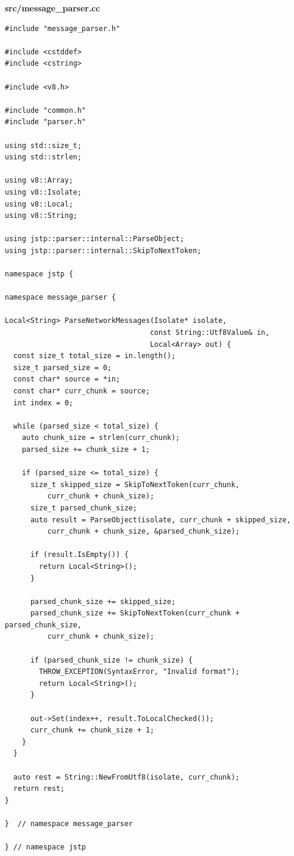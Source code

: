 \documentclass[%
  ukrainian, utf8, columnvii, simple,
  hpadding=10mm, vpadding=10mm, reduceheight=2mm,
  floatsection,
]{eskdtext}
\begin{document}
\textbf{src/message\_parser.cc}

\begin{verbatim}
#include "message_parser.h"

#include <cstddef>
#include <cstring>

#include <v8.h>

#include "common.h"
#include "parser.h"

using std::size_t;
using std::strlen;

using v8::Array;
using v8::Isolate;
using v8::Local;
using v8::String;

using jstp::parser::internal::ParseObject;
using jstp::parser::internal::SkipToNextToken;

namespace jstp {

namespace message_parser {

Local<String> ParseNetworkMessages(Isolate* isolate,
                                  const String::Utf8Value& in,
                                  Local<Array> out) {
  const size_t total_size = in.length();
  size_t parsed_size = 0;
  const char* source = *in;
  const char* curr_chunk = source;
  int index = 0;

  while (parsed_size < total_size) {
    auto chunk_size = strlen(curr_chunk);
    parsed_size += chunk_size + 1;

    if (parsed_size <= total_size) {
      size_t skipped_size = SkipToNextToken(curr_chunk,
          curr_chunk + chunk_size);
      size_t parsed_chunk_size;
      auto result = ParseObject(isolate, curr_chunk + skipped_size,
          curr_chunk + chunk_size, &parsed_chunk_size);

      if (result.IsEmpty()) {
        return Local<String>();
      }

      parsed_chunk_size += skipped_size;
      parsed_chunk_size += SkipToNextToken(curr_chunk + parsed_chunk_size,
          curr_chunk + chunk_size);

      if (parsed_chunk_size != chunk_size) {
        THROW_EXCEPTION(SyntaxError, "Invalid format");
        return Local<String>();
      }

      out->Set(index++, result.ToLocalChecked());
      curr_chunk += chunk_size + 1;
    }
  }

  auto rest = String::NewFromUtf8(isolate, curr_chunk);
  return rest;
}

}  // namespace message_parser

} // namespace jstp
\end{verbatim}
\end{document}
